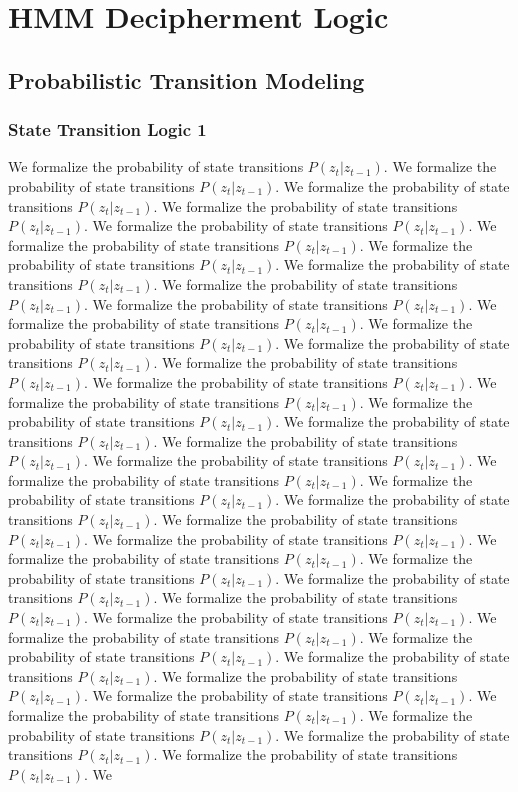\chapter{HMM Decipherment Logic}
\section{Probabilistic Transition Modeling}
\subsection{State Transition Logic 1}
We formalize the probability of state transitions $P(z_t | z_{t-1})$. We formalize the probability of state transitions $P(z_t | z_{t-1})$. We formalize the probability of state transitions $P(z_t | z_{t-1})$. We formalize the probability of state transitions $P(z_t | z_{t-1})$. We formalize the probability of state transitions $P(z_t | z_{t-1})$. We formalize the probability of state transitions $P(z_t | z_{t-1})$. We formalize the probability of state transitions $P(z_t | z_{t-1})$. We formalize the probability of state transitions $P(z_t | z_{t-1})$. We formalize the probability of state transitions $P(z_t | z_{t-1})$. We formalize the probability of state transitions $P(z_t | z_{t-1})$. We formalize the probability of state transitions $P(z_t | z_{t-1})$. We formalize the probability of state transitions $P(z_t | z_{t-1})$. We formalize the probability of state transitions $P(z_t | z_{t-1})$. We formalize the probability of state transitions $P(z_t | z_{t-1})$. We formalize the probability of state transitions $P(z_t | z_{t-1})$. We formalize the probability of state transitions $P(z_t | z_{t-1})$. We formalize the probability of state transitions $P(z_t | z_{t-1})$. We formalize the probability of state transitions $P(z_t | z_{t-1})$. We formalize the probability of state transitions $P(z_t | z_{t-1})$. We formalize the probability of state transitions $P(z_t | z_{t-1})$. We formalize the probability of state transitions $P(z_t | z_{t-1})$. We formalize the probability of state transitions $P(z_t | z_{t-1})$. We formalize the probability of state transitions $P(z_t | z_{t-1})$. We formalize the probability of state transitions $P(z_t | z_{t-1})$. We formalize the probability of state transitions $P(z_t | z_{t-1})$. We formalize the probability of state transitions $P(z_t | z_{t-1})$. We formalize the probability of state transitions $P(z_t | z_{t-1})$. We formalize the probability of state transitions $P(z_t | z_{t-1})$. We formalize the probability of state transitions $P(z_t | z_{t-1})$. We formalize the probability of state transitions $P(z_t | z_{t-1})$. We formalize the probability of state transitions $P(z_t | z_{t-1})$. We formalize the probability of state transitions $P(z_t | z_{t-1})$. We formalize the probability of state transitions $P(z_t | z_{t-1})$. We formalize the probability of state transitions $P(z_t | z_{t-1})$. We formalize the probability of state transitions $P(z_t | z_{t-1})$. We formalize the probability of state transitions $P(z_t | z_{t-1})$. We formalize the probability of state transitions $P(z_t | z_{t-1})$. We formalize the probability of state transitions $P(z_t | z_{t-1})$. We formalize the probability of state transitions $P(z_t | z_{t-1})$. We 